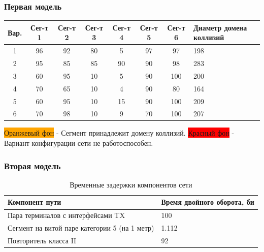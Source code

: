 \begin{frame}
\frametitle{Первая модель}
\begin{tabular}{|c|c|c|c|c|c|c|m{1cm}|}
    \hline
    Вар. & Сег-т 1 & Сег-т 2 & Сег-т 3 &\cellcolor{lightgray} Сег-т 4 & Сег-т 5 & Сег-т 6 & Диаметр домена коллизий \\ \hline
        1 &\cellcolor{orange} 96 & 92 & 80 &\cellcolor{orange} 5 &\cellcolor{orange} 97 & 97 & 198 \\ \hline
        2 &\cellcolor{orange} 95 & 85 & 85 &\cellcolor{orange} 90 & 90 &\cellcolor{orange} 98 & \cellcolor{red} 283 \\ \hline
        3 & 60 &\cellcolor{orange} 95 & 10 &\cellcolor{orange} 5 & 90 &\cellcolor{orange} 100 & 200 \\ \hline
        4 &\cellcolor{orange} 70 & 65 & 10 &\cellcolor{orange} 4 &\cellcolor{orange} 90 & 80 & 164 \\ \hline
        5 & 60 &\cellcolor{orange} 95 & 10 &\cellcolor{orange} 15 & 90 &\cellcolor{orange} 100 &\cellcolor{red} 209 \\ \hline
        6 & 70 &\cellcolor{orange} 98 & 10 &\cellcolor{orange} 9 & 70 &\cellcolor{orange} 100 &\cellcolor{red} 207 \\ \hline
    \end{tabular}
\colorbox{orange}{Оранжевый фон} - Сегмент принадлежит домену коллизий.
\colorbox{red}{Красный фон} - Вариант конфигурации сети не работоспособен.
\end{frame}

\begin{frame}
\frametitle{Вторая модель}
\begin{table}[!ht]
    \caption{Временные задержки компонентов сети}
    \label{tab:data}
    \centering
    \begin{tabular}{|m{5cm}|l|}
    \hline
        Компонент пути & Время двойного оборота, би \\ \hline
        Пара терминалов с интерфейсами TX & 100 \\ \hline
        Сегмент на витой паре категории 5 (на 1 метр) & 1.112 \\ \hline
        Повторитель класса II  & 92 \\ \hline
    \end{tabular}
\end{table}
\end{frame}

